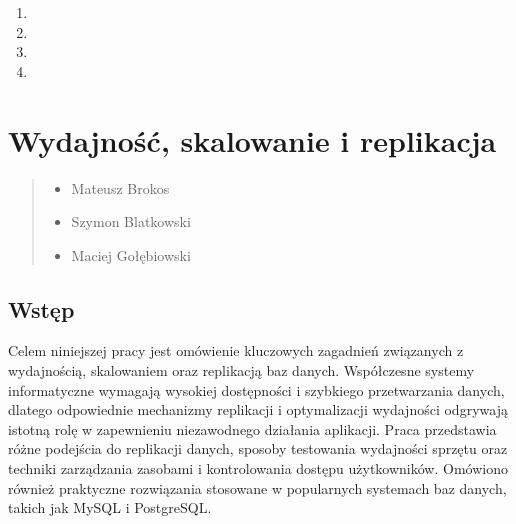 \documentclass[letterpaper,10pt,polish]{sphinxmanual}
\begin{document}
\begin{enumerate}
\item {} 
\sphinxAtStartPar
{}

\item {} 
\sphinxAtStartPar
{}

\item {} 
\sphinxAtStartPar
{}

\item {} 
\sphinxAtStartPar
{}

\end{enumerate}

\sphinxstepscope


\section{Wydajność, skalowanie i replikacja}
\label{\detokenize{rozdzial2/Wydajnosc_Skalowanie_i_Replikacja/index:wydajnosc-skalowanie-i-replikacja}}\label{\detokenize{rozdzial2/Wydajnosc_Skalowanie_i_Replikacja/index::doc}}\begin{quote}\begin{description}
\begin{itemize}
\item {} 
\sphinxAtStartPar
Mateusz Brokos

\item {} 
\sphinxAtStartPar
Szymon Blatkowski

\item {} 
\sphinxAtStartPar
Maciej Gołębiowski

\end{itemize}

\end{description}\end{quote}


\subsection{Wstęp}
\label{\detokenize{rozdzial2/Wydajnosc_Skalowanie_i_Replikacja/index:wstep}}
\sphinxAtStartPar
Celem niniejszej pracy jest omówienie kluczowych zagadnień związanych z wydajnością, skalowaniem oraz replikacją baz danych. Współczesne systemy informatyczne wymagają wysokiej dostępności i szybkiego przetwarzania danych, dlatego odpowiednie mechanizmy replikacji i optymalizacji wydajności odgrywają istotną rolę w zapewnieniu niezawodnego działania aplikacji. Praca przedstawia różne podejścia do replikacji danych, sposoby testowania wydajności sprzętu oraz techniki zarządzania zasobami i kontrolowania dostępu użytkowników. Omówiono również praktyczne rozwiązania stosowane w popularnych systemach baz danych, takich jak MySQL i PostgreSQL.
\end{document}
